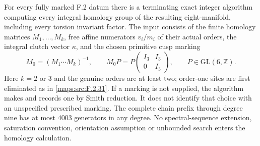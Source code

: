 \begin{theorem}\label{maps:src:F.2.35}


For every fully marked F.2 datum there is a terminating exact
integer algorithm computing every integral homology group of
the resulting eight-manifold, including every torsion invariant
factor.  The input consists of the finite homology matrices
$M_1,\ldots,M_k$, free affine numerators $v_i/m_i$ of their
actual orders, the integral clutch vector $\kappa$, and the
chosen primitive cusp marking
\[
 M_0=(M_1\cdots M_k)^{-1},\qquad
 M_0P=P\begin{pmatrix}I_3&I_3\\0&I_3\end{pmatrix},
 \qquad P\in\mathrm{GL}(6,\mathbb Z).                       \tag{F.GC1}\label{maps:eq:F.GC1}
\]
Here $k=2$ or $3$ and the genuine orders are at least two;
order-one sites are first eliminated as in \ref{maps:src:F.2.31}.
If a marking is not supplied, the algorithm makes and records
one by Smith reduction.  It does not identify that choice
with an unspecified prescribed marking.
The complete chain prefix through degree nine has at most
4003 generators in any degree.  No spectral-sequence
extension, saturation convention, orientation assumption or
unbounded search enters the homology calculation.

\end{theorem}
